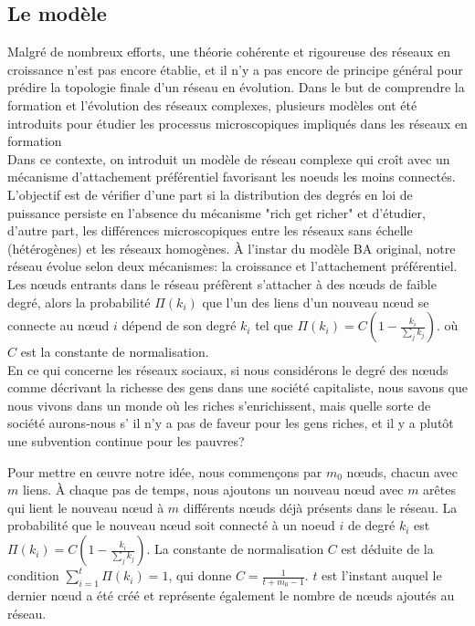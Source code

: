 \subsection{Le modèle}
Malgré de nombreux efforts, une théorie cohérente et rigoureuse des réseaux en croissance n'est pas encore établie, et 
il n'y a pas encore de principe général pour prédire la topologie finale d'un réseau en évolution. Dans le but de comprendre 
la  formation  et l'évolution des réseaux complexes, plusieurs modèles ont été introduits pour étudier les processus
microscopiques impliqués dans les réseaux en formation %
\\
Dans ce contexte, on introduit un modèle de réseau  complexe qui croît avec un mécanisme 
d'attachement préférentiel favorisant les noeuds les moins connectés.
L'objectif est de vérifier d'une part si la distribution des degrés en loi de puissance persiste en l'absence du 
mécanisme "rich get richer" et d'étudier, d'autre part,  les différences microscopiques entre les 
réseaux sans échelle (hétérogènes) et les réseaux homogènes. 
À l'instar du modèle BA original, notre réseau évolue selon deux mécanismes: la croissance et l'attachement préférentiel. Les nœuds entrants dans le réseau préfèrent s'attacher à des nœuds de faible degré, alors la probabilité $\Pi(k_i)$ que l'un des liens d'un nouveau nœud se connecte au nœud $i$ dépend de son degré $k_i$ tel que $\Pi(k_i)=C(1-\frac{k_i}{\sum_jk_j})$. où $C$ est la constante de normalisation.\\
En ce qui concerne les réseaux sociaux, si nous considérons le degré des nœuds comme décrivant la richesse des gens dans une société capitaliste, nous savons que nous vivons dans un monde où les riches s'enrichissent, mais quelle sorte de société aurons-nous s' il n'y a pas de faveur pour les gens riches, et il y a plutôt une subvention continue pour les pauvres?

Pour mettre en œuvre notre idée, nous commençons par $m_0$ nœuds, chacun avec $m$ liens. À chaque pas de temps, nous ajoutons un nouveau nœud avec $m$ arêtes qui lient le nouveau nœud à $m$ différents nœuds déjà présents dans le réseau. La probabilité que le nouveau nœud soit connecté à un noeud $i$ de degré $k_i$ est $\Pi(k_i)=C(1-\frac{k_i}{\sum_jk_j})$. La constante de normalisation $C$ est déduite de la condition $\sum_{i=1}^{t}\Pi(k_i)=1$, qui donne $C=\frac{1}{t+m_0-1}$. $t$ est l'instant auquel le dernier nœud a été créé et représente également le nombre de nœuds ajoutés au réseau.

